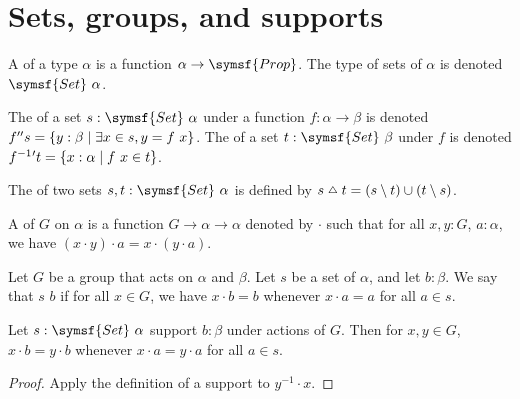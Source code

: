 \section{Sets, groups, and supports}

\begin{definition}
    A  of a type \( \alpha \) is a function \( \alpha \to \symsf{Prop} \).
    The type of sets of \( \alpha \) is denoted \( \symsf{Set}\ \alpha \).
\end{definition}
\begin{definition}
    The  of a set \( s : \symsf{Set}\ \alpha \) under a function \( f \colon \alpha \to \beta \) is denoted \( f '' s = \qty{y : \beta \mid \exists x \in s, y = f\ x} \).
    The  of a set \( t : \symsf{Set}\ \beta \) under \( f \) is denoted \( f^{-1}{}' t = \qty{x : \alpha \mid f\ x \in t} \).
\end{definition}
\begin{definition}
    The  of two sets \( s, t : \symsf{Set}\ \alpha \) is defined by \( s \symmdiff t = (s \setminus t) \cup (t \setminus s) \).
\end{definition}
\begin{definition}
    A  of \( G \) on \( \alpha \) is a function \( G \to \alpha \to \alpha \) denoted by \( \cdot \) such that for all \( x, y : G \), \( a : \alpha \), we have \( (x \cdot y) \cdot a = x \cdot (y \cdot a) \).
\end{definition}
\begin{definition}
    \label{def:supports}
    Let \( G \) be a group that acts on \( \alpha \) and \( \beta \).
    Let \( s \) be a set of \( \alpha \), and let \( b : \beta \).
    We say that \( s \)  \( b \) if for all \( x \in G \), we have \( x \cdot b = b \) whenever \( x \cdot a = a \) for all \( a \in s \).
\end{definition}
\begin{lemma}
    \label{lem:smul_eq_smul_of_supports}
    Let \( s : \symsf{Set}\ \alpha \) support \( b : \beta \) under actions of \( G \).
    Then for \( x, y \in G \), \( x \cdot b = y \cdot b \) whenever \( x \cdot a = y \cdot a \) for all \( a \in s \).
\end{lemma}
\begin{proof}
    Apply the definition of a support to \( y^{-1} \cdot x \).
\end{proof}
